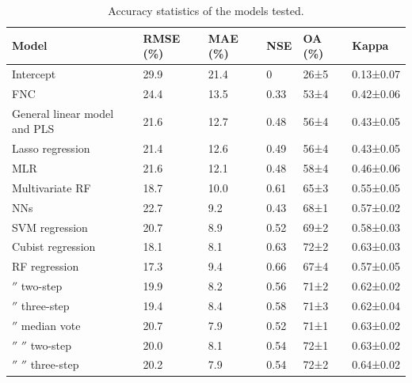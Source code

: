 \documentclass[a4paper,10pt]{article}
\begin{document}
\begin{table}
\centering
\begin{tabular}{llllll}
\toprule
\textbf{Model} & \textbf{\ac{RMSE} (\%)} & \textbf{\ac{MAE} (\%)} & \textbf{\acrshort{NSE}} & \textbf{\ac{OA} (\%)} & \textbf{Kappa} \\
\midrule
Intercept
& 29.9  & 21.4  & 0     & 26±5  & 0.13±0.07 \\
\Gls{FNC}
& 24.4  & 13.5  & 0.33  & 53±4  & 0.42±0.06 \\
General linear model and \Gls{PLS}
& 21.6  & 12.7  & 0.48  & 56±4  & 0.43±0.05 \\
Lasso regression
& 21.4  & 12.6  & 0.49  & 56±4  & 0.43±0.05 \\
\Gls{MLR}
& 21.6  & 12.1  & 0.48  & 58±4  & 0.46±0.06 \\
Multivariate RF
& 18.7  & 10.0  & 0.61  & 65±3  & 0.55±0.05 \\
\Glspl{NN}
& 22.7  & 9.2   & 0.43  & 68±1  & 0.57±0.02 \\
\Gls{SVM} regression
& 20.7  & 8.9   & 0.52  & 69±2  & 0.58±0.03 \\
Cubist regression
& 18.1  & 8.1   & 0.63  & 72±2  & 0.63±0.03 \\
\Gls{RF} regression
& 17.3  & 9.4   & 0.66  & 67±4  & 0.57±0.05 \\
\ensuremath{''} two-step
& 19.9  & 8.2   & 0.56  & 71±2  & 0.62±0.02 \\
\ensuremath{''} three-step
& 19.4  & 8.4   & 0.58  & 71±3  & 0.62±0.04 \\
\ensuremath{''} median vote
& 20.7  & 7.9   & 0.52  & 71±1  & 0.63±0.02 \\
\ensuremath{''} \ensuremath{''} two-step
& 20.0  & 8.1   & 0.54  & 72±1  & 0.63±0.02 \\
\ensuremath{''} \ensuremath{''} three-step
& 20.2  & 7.9   & 0.54  & 72±2  & 0.64±0.02 \\
\bottomrule
\end{tabular}
\caption{Accuracy statistics of the models tested.}
\label{tab-accuracy}
\end{table}
\end{document}
